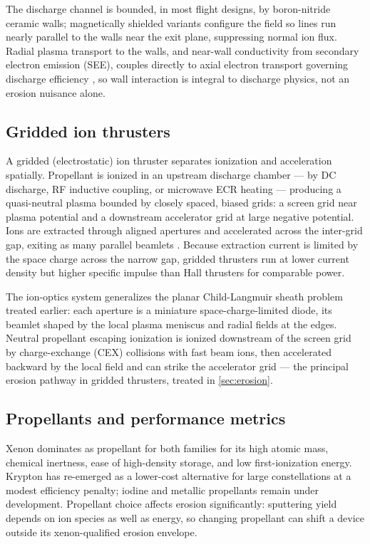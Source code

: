 The discharge channel is bounded, in most flight designs, by boron-nitride ceramic walls; magnetically shielded variants configure the field so lines run nearly parallel to the walls near the exit plane, suppressing normal ion flux. Radial plasma transport to the walls, and near-wall conductivity from secondary electron emission (SEE), couples directly to axial electron transport governing discharge efficiency \cite{ref0425}, so wall interaction is integral to discharge physics, not an erosion nuisance alone.

\subsection{Gridded ion thrusters}

A gridded (electrostatic) ion thruster separates ionization and acceleration spatially. Propellant is ionized in an upstream discharge chamber — by DC discharge, RF inductive coupling, or microwave ECR heating — producing a quasi-neutral plasma bounded by closely spaced, biased grids: a screen grid near plasma potential and a downstream accelerator grid at large negative potential. Ions are extracted through aligned apertures and accelerated across the inter-grid gap, exiting as many parallel beamlets \cite{ref0115}. Because extraction current is limited by the space charge across the narrow gap, gridded thrusters run at lower current density but higher specific impulse than Hall thrusters for comparable power.

The ion-optics system generalizes the planar Child-Langmuir sheath problem treated earlier: each aperture is a miniature space-charge-limited diode, its beamlet shaped by the local plasma meniscus and radial fields at the edges. Neutral propellant escaping ionization is ionized downstream of the screen grid by charge-exchange (CEX) collisions with fast beam ions, then accelerated backward by the local field and can strike the accelerator grid — the principal erosion pathway in gridded thrusters, treated in \cref{sec:erosion}.

\subsection{Propellants and performance metrics}

Xenon dominates as propellant for both families for its high atomic mass, chemical inertness, ease of high-density storage, and low first-ionization energy. Krypton has re-emerged as a lower-cost alternative for large constellations at a modest efficiency penalty; iodine and metallic propellants remain under development. Propellant choice affects erosion significantly: sputtering yield depends on ion species as well as energy, so changing propellant can shift a device outside its xenon-qualified erosion envelope.

